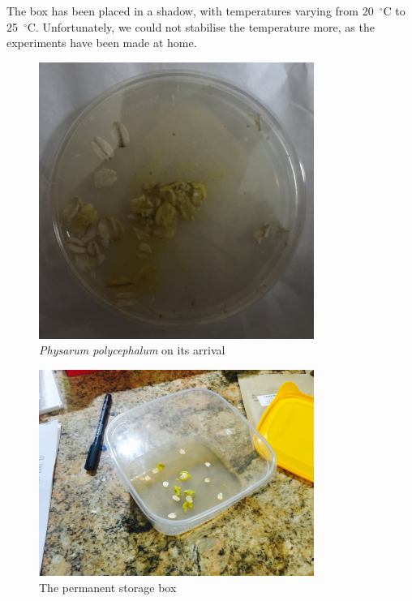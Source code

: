 The box has been placed in a shadow, with temperatures varying from 20~$^{\circ}$C to 25~$^{\circ}$C. Unfortunately, we could not stabilise the temperature more, as the experiments have been made at home.

\begin{figure}
  \centering

  \includegraphics[width=0.8\textwidth]{figures/physarum/IMG_1168_crop.jpg}

  \caption{\textit{Physarum polycephalum} on its arrival}
  \label{figure:p_initial_petri}
\end{figure}

\begin{figure}
  \centering

  \includegraphics[width=0.8\textwidth]{figures/physarum/IMG_1179.jpg}

  \caption{The permanent storage box}
  \label{figure:p_box}
\end{figure}

